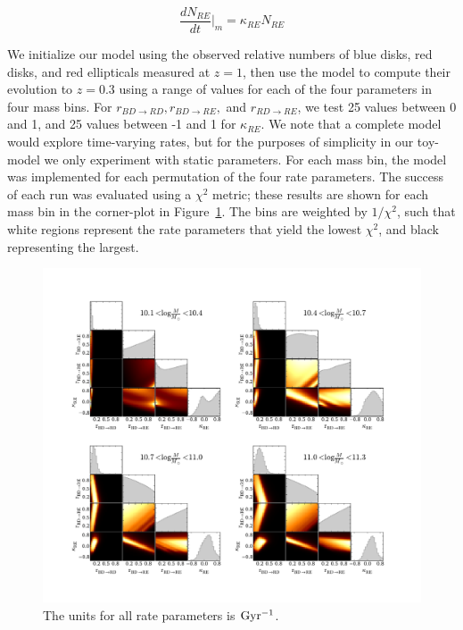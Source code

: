 \documentclass[useAMS,usenatbib]{mn2e}
\begin{document}
\begin{equation}
\frac{dN_{RE}}{dt}\Big\rvert_{m} = \kappa_{RE} N_{RE}  
\label{eqn:RE}
\end{equation}

We initialize our model using the observed relative numbers of blue disks, red disks, and red ellipticals measured at $z=1$, then use the model to compute their evolution to $z=0.3$ using a range of values for each of the four parameters in four mass bins. For $r_{BD \rightarrow RD}, r_{BD \rightarrow RE},$ and $r_{RD \rightarrow RE}$, we test 25 values between 0 and 1, and 25 values between -1 and 1 for $\kappa_{RE}$. We note that a complete model would explore time-varying rates, but for the purposes of simplicity in our toy-model we only experiment with static parameters. For each mass bin, the model was implemented for each permutation of the four rate parameters. The success of each run was evaluated using a $\chi^2$ metric; these results are shown for each mass bin in the corner-plot in Figure~\ref{fig:corner}. The bins are weighted by $1/\chi^2$, such that white regions represent the rate parameters that yield the lowest $\chi^2$, and black representing the largest.

\begin{figure}
\centering
\includegraphics[width=\textwidth,trim={0cm 0cm 2cm 1cm},clip]{figures/corner_plot.pdf}
\caption{The units for all rate parameters is $\rm Gyr^{-1}$.}
\label{fig:corner}
\end{figure} 
\end{document}
